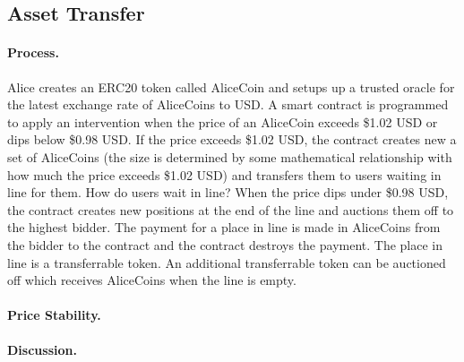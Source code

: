 

\subsection{Asset Transfer}
\label{sec:basecoin}


\paragraph{Process.} Alice creates an ERC20 token called AliceCoin and setups up a trusted oracle for the latest exchange rate of AliceCoins to USD. A smart contract is programmed to apply an intervention when the price of an AliceCoin exceeds \$1.02 USD or dips below \$0.98 USD.  If the price exceeds \$1.02 USD, the contract creates new a set of AliceCoins (the size is determined by some mathematical relationship with how much the price exceeds \$1.02 USD) and transfers them to users waiting in line for them. How do users wait in line? When the price dips under \$0.98 USD, the contract creates new positions at the end of the line and auctions them off to the highest bidder. The payment for a place in line is made in AliceCoins from the bidder to the contract and the contract destroys the payment. The place in line is a transferrable token. An additional transferrable token can be auctioned off which receives AliceCoins when the line is empty.


\paragraph{Price Stability.}

\paragraph{Discussion.}

